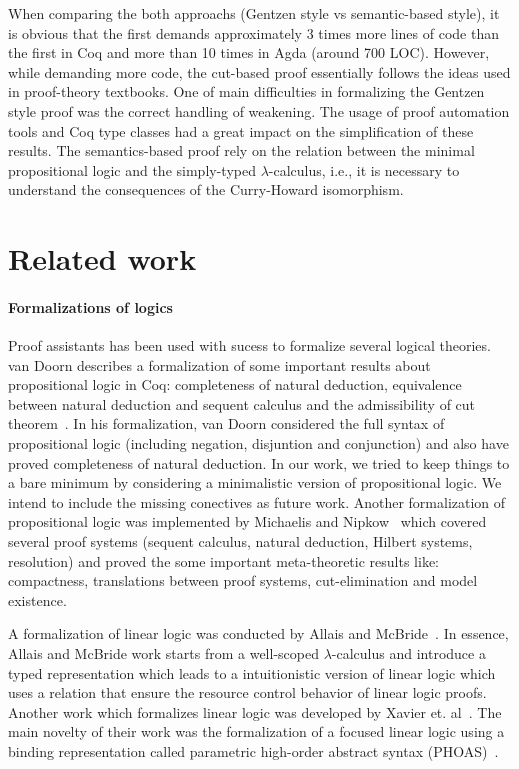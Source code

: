 When comparing the both approachs (Gentzen style vs semantic-based style), it is obvious that the
first demands approximately 3 times more lines of code than the first in Coq and more than 10
times in Agda (around 700 LOC).
However, while demanding more code, the cut-based proof essentially follows the ideas used in
proof-theory textbooks. One of main difficulties in formalizing the Gentzen style proof was the correct handling of
weakening. The usage of proof automation tools and Coq type classes had a great impact
on the simplification of these results.
The semantics-based proof rely on the relation between the minimal propositional logic and
the simply-typed $\lambda$-calculus, i.e., it is necessary to understand the consequences
of the Curry-Howard isomorphism.


\section{Related work}\label{sec:related}


\paragraph{Formalizations of logics}Proof assistants has been used with sucess to formalize
several logical theories. van Doorn describes a formalization of some important results about
propositional logic in Coq: completeness of natural deduction, equivalence between natural
deduction and sequent calculus and the admissibility of cut theorem~\cite{doorn2015}. In his formalization,
van Doorn considered the full syntax of propositional logic (including negation, disjuntion and conjunction) and
also have proved completeness of natural deduction. In our work, we tried to keep things to a bare minimum by
considering a minimalistic version of propositional logic. We intend to include the missing conectives as
future work. Another formalization of propositional logic was implemented by Michaelis and Nipkow~\cite{Nipkow17} which
covered several proof systems (sequent calculus, natural deduction, Hilbert systems, resolution) and proved the some
important meta-theoretic results like: compactness, translations between proof systems, cut-elimination and model existence.


A formalization of linear logic was conducted by Allais and McBride~\cite{allais18}. In essence, Allais and McBride work
starts from a well-scoped $\lambda$-calculus and introduce a typed representation which leads to a intuitionistic version
of linear logic which uses a relation that ensure the resource control behavior of linear logic proofs. Another work which
formalizes linear logic was developed by Xavier et. al~\cite{xavier18}. The main novelty of their work was the formalization
of a focused linear logic using a binding representation called parametric high-order abstract syntax (PHOAS)~\cite{Chlipala08}.


